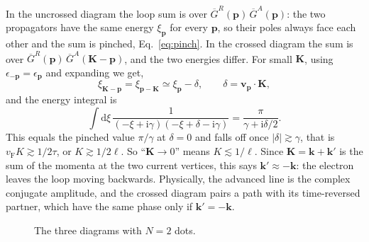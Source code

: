 In the uncrossed diagram the loop sum is over
$\overline G^R(\mathbf p)\,\overline G^A(\mathbf p)$: the two
propagators have the same energy $\xi_{\mathbf p}$ for every
$\mathbf p$, so their poles always face each other and the sum
is pinched, Eq.~\eqref{eq:pinch}. In the crossed diagram the sum is over
$\overline G^R(\mathbf p)\,\overline G^A(\mathbf K-\mathbf p)$,
and the two energies differ. For small $\mathbf K$, using
$\epsilon_{-\mathbf p}=\epsilon_{\mathbf p}$ and expanding we get,
\[
\xi_{\mathbf K-\mathbf p}
=\xi_{\mathbf p-\mathbf K}
\simeq\xi_{\mathbf p}-\delta,
\qquad
\delta=\mathbf v_{\mathbf p}\cdot\mathbf K,
\]
and the energy integral is
\begin{equation}
\int\mathrm d\xi\,
\frac{1}{(-\xi+\mathrm i\gamma)
(-\xi+\delta-\mathrm i\gamma)}
=\frac{\pi}{\gamma+\mathrm i\delta/2}.
\label{eq:crossint}
\end{equation}
This equals the pinched value $\pi/\gamma$ at $\delta=0$ and
falls off once $|\delta|\gtrsim\gamma$, that is
$v_{\mathrm F}K\gtrsim1/2\tau$, or
$K\gtrsim1/2\ell$. So ``$\mathbf K\to0$'' means
$K\lesssim1/\ell$. Since $\mathbf K=\mathbf k+\mathbf k'$ is
the sum of the momenta at the two current vertices, this says
$\mathbf k'\approx-\mathbf k$: the electron leaves the loop
moving backwards. Physically, the advanced line is the complex
conjugate amplitude, and the crossed diagram pairs a path with
its time-reversed partner, which have the same phase only if
$\mathbf k'=-\mathbf k$.

\begin{figure}[ht]
\centering
{}
\caption{The three diagrams with $N=2$ dots.}
\label{fig:lowest}
\end{figure}

